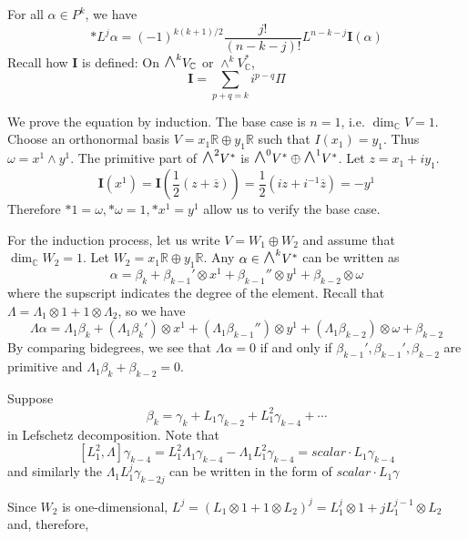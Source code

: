 \documentclass[12pt]{article}
\theoremstyle{plain}
\theoremstyle{definition}
\newcommand{\IC}{\mathbb{C}}
\newcommand{\IR}{\mathbb{R}}
\newcommand\tensor{{\otimes}}
\newcommand{\<}{\langle}
\renewcommand{\>}{\rangle}
\newcommand{\w}{\omega}
\newcommand{\bI}{\mathbf{I}}
\newcommand{\bz}{\overline{z}}
\newcommand{\bwedge}{\mbox{\Large $\wedge$}}
\begin{document}
For all $\alpha \in P^k$, we have 
$$ * L^j \alpha = (-1)^{k(k+1)/2} \frac{j!}{(n - k - j)!} L^{n - k - j} \bI(\alpha) $$
Recall how $\bI$ is defined: On $\bwedge^k V_\IC$ or $\wedge^k V_\IC^*$,  
$$ \bI = \sum_{p + q = k} i^{p - q} \Pi $$

We prove the equation by induction. The base case is $n = 1$, i.e. $\dim_\IC V = 1$. Choose an orthonormal basis $V = x_1 \IR \oplus y_1 \IR$ such that $I(x_1) = y_1$. Thus $\w = x^1 \wedge y^1$. The primitive part of $\bwedge^2 V^*$ is $\bwedge^0 V^* \oplus \bwedge^1 V^*$.  Let $z = x_1 + i y_1$. 
$$ \bI(x^1) = \bI(\frac{1}{2}(z + \bz)) = \frac{1}{2} (iz + i^{-1} \bz) = - y^1 $$ 
Therefore $*1 = \w, *\w = 1, * x^1 = y^1$ allow us to verify the base case. 

For the induction process, let us write $V = W_1 \oplus W_2$ and assume that $\dim_\IC W_2 = 1$. Let $W_2 = x_1 \IR \oplus y_1 \IR$. Any $\alpha \in \bwedge^k V^*$ can be written as 
$$ \alpha = \beta_k + \beta_{k-1}' \tensor x^1 + \beta_{k - 1}'' \tensor y^1 + \beta_{k - 2} \tensor \w $$
where the supscript indicates the degree of the element. Recall that $\Lambda = \Lambda_1 \tensor 1 + 1 \tensor \Lambda_2$, so we have 
$$ \Lambda \alpha = \Lambda_1 \beta_k +(\Lambda_1 \beta_k') \tensor x^1 + (\Lambda_1 \beta_{k-1}'') \tensor y^1 + (\Lambda_1 \beta_{k - 2}) \tensor \w + \beta_{k - 2} $$
By comparing bidegrees, we see that $\Lambda \alpha = 0$ if and only if $\beta_{k -1}', \beta_{k - 1}', \beta_{k -2}$ are primitive and $\Lambda_1 \beta_k + \beta_{k - 2} = 0$.

Suppose $$\beta_k = \gamma_k + L_1 \gamma_{k - 2} + L_1^2 \gamma_{k - 4} + \cdots $$ in Lefschetz decomposition. Note that 
$$ [L_1^2, \Lambda] \gamma_{k - 4} = L_1^2 \Lambda_1 \gamma_{k - 4} - \Lambda_1 L_1^2 \gamma_{k - 4} = \textit{scalar} \cdot L_1 \gamma_{k - 4} $$ 
and similarly the $ \Lambda_1 L_1^j \gamma_{k - 2j}$ can be written in the form of $\textit{scalar} \cdot L_1 \gamma$

Since $W_2$ is one-dimensional, $L^j = (L_1 \tensor 1 + 1 \tensor L_2)^j = L_1^j \tensor 1 + j L_1^{j - 1} \tensor L_2$ and, therefore, 
\end{document}
